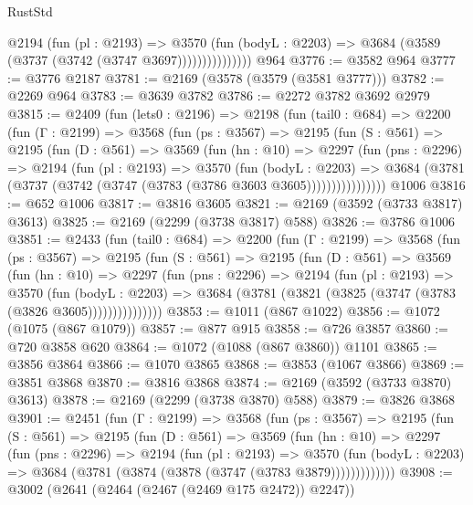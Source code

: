 \begin{lexlean}{RustStd}
\begin{coremodule}
{\begin{coremodule}
{{{{{{{{{{{{{{{                    @2194
                      (fun (pl : @2193) =>
                      @3570
                        (fun (bodyL : @2203) =>
                        @3684 (@3589 (@3737 (@3742 (@3747 @3697)))))))))))))))
    @964
@3776 := @3582 @964
@3777 := @3776 @2187
@3781 := @2169 (@3578 (@3579 (@3581 @3777)))
@3782 := @2269 @964
@3783 := @3639 @3782
@3786 := @2272 @3782 @3692 @2979
@3815 := @2409
    (fun (lets0 : @2196) =>
    @2198
      (fun (tail0 : @684) =>
      @2200
        (fun (Γ : @2199) =>
        @3568
          (fun (ps : @3567) =>
          @2195
            (fun (S : @561) =>
            @2195
              (fun (D : @561) =>
              @3569
                (fun (hn : @10) =>
                @2297
                  (fun (pns : @2296) =>
                  @2194
                    (fun (pl : @2193) =>
                    @3570
                      (fun (bodyL : @2203) =>
                      @3684 (@3781 (@3737 (@3742 (@3747 (@3783 (@3786 @3603 @3605))))))))))))))))
    @1006
@3816 := @652 @1006
@3817 := @3816 @3605
@3821 := @2169 (@3592 (@3733 @3817) @3613)
@3825 := @2169 (@2299 (@3738 @3817) @588)
@3826 := @3786 @1006
@3851 := @2433
    (fun (tail0 : @684) =>
    @2200
      (fun (Γ : @2199) =>
      @3568
        (fun (ps : @3567) =>
        @2195
          (fun (S : @561) =>
          @2195
            (fun (D : @561) =>
            @3569
              (fun (hn : @10) =>
              @2297
                (fun (pns : @2296) =>
                @2194
                  (fun (pl : @2193) =>
                  @3570
                    (fun (bodyL : @2203) =>
                    @3684 (@3781 (@3821 (@3825 (@3747 (@3783 (@3826 @3605)))))))))))))))
@3853 := @1011 (@867 @1022)
@3856 := @1072 (@1075 (@867 @1079))
@3857 := @877 @915
@3858 := @726 @3857
@3860 := @720 @3858 @620
@3864 := @1072 (@1088 (@867 @3860)) @1101
@3865 := @3856 @3864
@3866 := @1070 @3865
@3868 := @3853 (@1067 @3866)
@3869 := @3851 @3868
@3870 := @3816 @3868
@3874 := @2169 (@3592 (@3733 @3870) @3613)
@3878 := @2169 (@2299 (@3738 @3870) @588)
@3879 := @3826 @3868
@3901 := @2451
    (fun (Γ : @2199) =>
    @3568
      (fun (ps : @3567) =>
      @2195
        (fun (S : @561) =>
        @2195
          (fun (D : @561) =>
          @3569
            (fun (hn : @10) =>
            @2297
              (fun (pns : @2296) =>
              @2194
                (fun (pl : @2193) =>
                @3570
                  (fun (bodyL : @2203) =>
                  @3684 (@3781 (@3874 (@3878 (@3747 (@3783 @3879)))))))))))))
@3908 := @3002 (@2641 (@2464 (@2467 (@2469 @175 @2472)) @2247))
}}}}}}}}}}}}}}}
\end{coremodule}}
\end{coremodule}
\end{lexlean}
